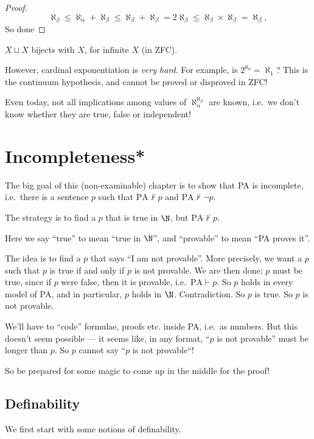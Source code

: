 \documentclass[a4paper]{article}
\begin{document}
\begin{proof}
  \[
    \aleph_\beta \leq \aleph_\alpha + \aleph_\beta \leq \aleph_\beta + \aleph_\beta = 2\aleph_\beta \leq \aleph_\beta\times \aleph_\beta = \aleph_\beta,
  \]
  So done
\end{proof}

\begin{eg}
  $X\sqcup X$ bijects with $X$, for infinite $X$ (in ZFC).
\end{eg}

However, cardinal exponentiation is \emph{very hard}. For example, is $2^{\aleph_0} = \aleph_1$? This is the continuum hypothesis, and cannot be proved or disproved in ZFC!

Even today, not all implications among values of $\aleph_\alpha^{\aleph_\beta}$ are known, i.e.\ we don't know whether they are true, false or independent!
\section{Incompleteness*}
The big goal of this (non-examinable) chapter is to show that PA is incomplete, i.e.\ there is a sentence $p$ such that $\mathrm{PA}\not\vdash p$ and $\mathrm{PA}\not\vdash \neg p$.

The strategy is to find a $p$ that is true in $\N$, but $\mathrm{PA}\not\vdash p$.

Here we say ``true'' to mean ``true in $\N$'', and ``provable'' to mean ``PA proves it''.

The idea is to find a $p$ that says ``I am not provable''. More precisely, we want a $p$ such that $p$ is true if and only if $p$ is not provable. We are then done: $p$ must be true, since if $p$ were false, then it is provable, i.e.\ $\mathrm{PA}\vdash p$. So $p$ holds in every model of PA, and in particular, $p$ holds in $\N$. Contradiction. So $p$ is true. So $p$ is not provable.

We'll have to ``code'' formulae, proofs etc. inside PA, i.e.\ as numbers. But this doesn't seem possible --- it seems like, in any format, ``$p$ is not provable'' must be longer than $p$. So $p$ cannot say ``$p$ is not provable``!

So be prepared for some magic to come up in the middle for the proof!

\subsection*{Definability}
We first start with some notions of definability.
\end{document}
